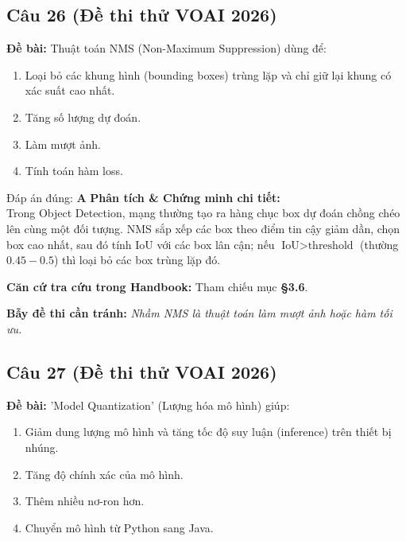 \documentclass[10pt,a4paper]{article}
\begin{document}
\subsection*{Câu 26 (Đề thi thử VOAI 2026)}
\textbf{Đề bài:} Thuật toán NMS (Non-Maximum Suppression) dùng để:

\begin{enumerate}[label=\textbf{\Alph*.}]
    \item Loại bỏ các khung hình (bounding boxes) trùng lặp và chỉ giữ lại khung có xác suất cao nhất.
    \item Tăng số lượng dự đoán.
    \item Làm mượt ảnh.
    \item Tính toán hàm loss.
\end{enumerate}

\begin{solbox}{Đáp án đúng: \textbf{A}}
\textbf{Phân tích \& Chứng minh chi tiết:} \\
Trong Object Detection, mạng thường tạo ra hàng chục box dự đoán chồng chéo lên cùng một đối tượng. NMS sắp xếp các box theo điểm tin cậy giảm dần, chọn box cao nhất, sau đó tính IoU với các box lân cận; nếu $\text{IoU} > \text{threshold}$ (thường $0.45 - 0.5$) thì loại bỏ các box trùng lặp đó.

\vspace{0.4em}
\textbf{Căn cứ tra cứu trong Handbook:} Tham chiếu mục \textbf{§3.6}.

\vspace{0.4em}
\textbf{Bẫy đề thi cần tránh:} \textit{Nhầm NMS là thuật toán làm mượt ảnh hoặc hàm tối ưu.}
\end{solbox}
\vspace{0.5em}


\subsection*{Câu 27 (Đề thi thử VOAI 2026)}
\textbf{Đề bài:} 'Model Quantization' (Lượng hóa mô hình) giúp:

\begin{enumerate}[label=\textbf{\Alph*.}]
    \item Giảm dung lượng mô hình và tăng tốc độ suy luận (inference) trên thiết bị nhúng.
    \item Tăng độ chính xác của mô hình.
    \item Thêm nhiều nơ-ron hơn.
    \item Chuyển mô hình từ Python sang Java.
\end{enumerate}
\end{document}
